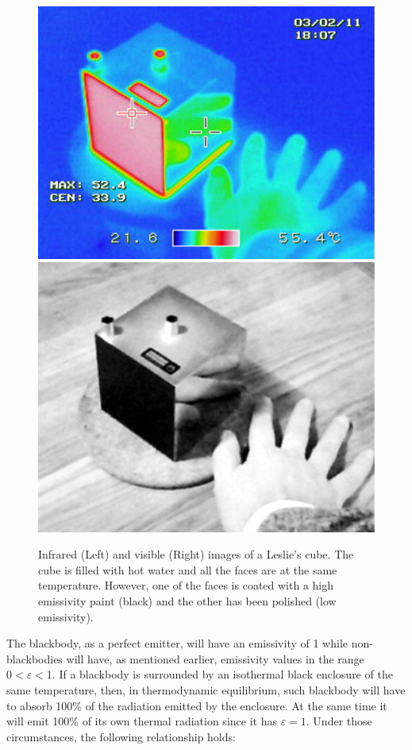 		\begin{figure}[ht!]
			\centering
			\captionsetup{justification=centering,margin=2cm}
			\includegraphics[scale=0.55]{Figures/Chapter01/LesliesCube.pdf}
			\includegraphics[scale=0.52]{Figures/Chapter01/LesliesCube2.pdf}
			\caption{Infrared (Left) and visible (Right) images of a Leslie’s cube. The cube is filled with hot water and all the faces are at the same temperature. However,  one of the faces is coated with a high emissivity paint (black) and the other has been polished (low emissivity).}\label{fig1.5}
		\end{figure}
		
		The blackbody, as a perfect emitter, will have an emissivity of 1 while non-blackbodies will have, as mentioned earlier, emissivity values in the range $0<\varepsilon<1$. If a blackbody is surrounded by an isothermal black enclosure of the same temperature, then, in thermodynamic equilibrium, such blackbody will have to absorb 100\% of the radiation emitted by the enclosure. At the same time it will emit 100\% of its own thermal radiation since it has $\varepsilon=1$. Under those circumstances, the following relationship holds:
		
